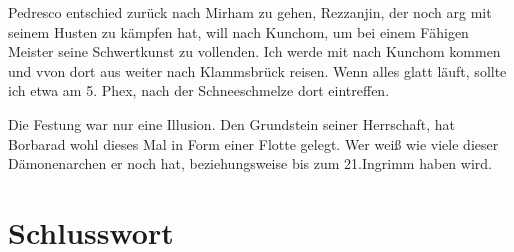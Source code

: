 Pedresco entschied zurück nach Mirham zu gehen, Rezzanjin, der noch arg mit seinem Husten zu kämpfen hat, will nach Kunchom, um bei einem Fähigen Meister seine Schwertkunst zu vollenden.
Ich werde mit nach Kunchom kommen und vvon dort aus weiter nach Klammsbrück reisen. Wenn alles glatt läuft, sollte ich etwa am 5. Phex, nach der Schneeschmelze dort eintreffen.

Die Festung war nur eine Illusion. Den Grundstein seiner Herrschaft, hat Borbarad wohl dieses Mal in Form einer Flotte gelegt. Wer weiß wie viele dieser Dämonenarchen er noch hat, beziehungsweise bis zum 21.Ingrimm haben wird.

\chapter{Schlusswort}